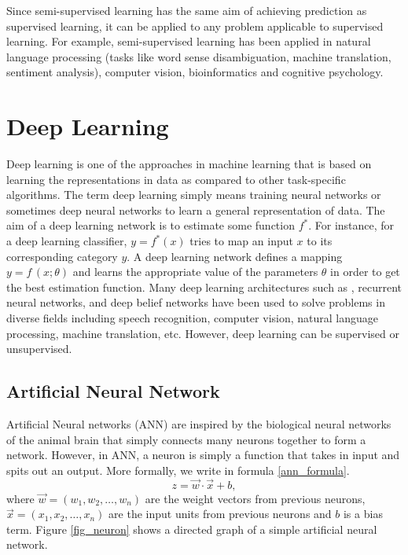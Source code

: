 \documentclass[master]{thesis-uestc}
\begin{document}
Since semi-supervised learning has the same aim of achieving prediction as supervised learning, it can be applied to any problem applicable to supervised learning. For example, semi-supervised learning has been applied in natural language processing (tasks like word sense disambiguation, machine translation, sentiment analysis), computer vision, bioinformatics and cognitive psychology.

\section{Deep Learning}
Deep learning is one of the approaches in machine learning that is based on learning the representations in data as compared to other task-specific algorithms. The term deep learning simply means training neural networks or sometimes deep neural networks to learn a general representation of data. The aim of a deep learning network is to estimate some function $f^*$. For instance, for a deep learning classifier, $y = f^*(x)$ tries to map an input $x$ to its corresponding category $y$. A deep learning network defines a mapping $y = f\,(x;\theta)$ and learns the appropriate value of the parameters $\theta$ in order to get the best estimation function. Many deep learning architectures such as , recurrent neural networks, and deep belief networks have been used to solve problems in diverse fields including speech recognition, computer vision, natural language processing, machine translation, etc. However, deep learning can be supervised or unsupervised.

\subsection{Artificial Neural Network}
Artificial Neural networks (ANN) are inspired by the biological neural networks of the animal brain that simply connects many neurons together to form a network. However, in ANN, a neuron is simply a function that takes in input and spits out an output. More formally, we write in formula \ref{ann_formula}. 
\begin{equation}
    z = \vec{w} \cdot \vec{x} + b,
\label{ann_formula}
\end{equation}
where $\vec{w} = (w_1, w_2, \dots, w_n)$ are the weight vectors from previous neurons, $\vec{x} = (x_1, x_2, \dots, x_n)$ are the input units from previous neurons and $b$ is a bias term. Figure \ref{fig_neuron} shows a directed graph of a simple artificial neural network.
\end{document}
